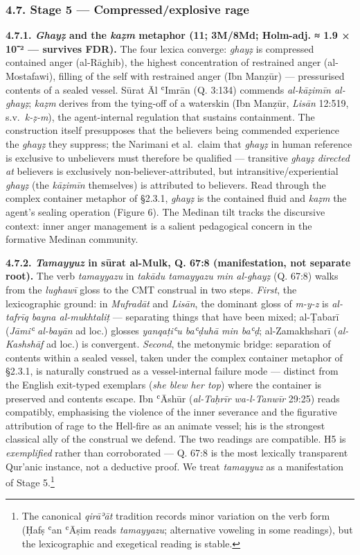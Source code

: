 \documentclass[11pt,a4paper]{article}
\begin{document}
\subsubsection{4.7. Stage 5 --- Compressed/explosive
rage}\label{stage-5-compressedexplosive-rage}

\textbf{4.7.1. \emph{Ghayẓ} and the \emph{kaẓm} metaphor (11; 3M/8Md;
Holm-adj. ≈ 1.9 × 10⁻² --- survives FDR).} The four lexica converge:
\emph{ghayẓ} is compressed contained anger (al-Rāghib), the highest
concentration of restrained anger (al-Mostafawi), filling of the self
with restrained anger (Ibn Manẓūr) --- pressurised contents of a sealed
vessel. Sūrat Āl ʿImrān (Q. 3:134) commends \emph{al-kāẓimīn al-ghayẓ};
\emph{kaẓm} derives from the tying-off of a waterskin (Ibn Manẓūr,
\emph{Lisān} 12:519, s.v.~\emph{k-ẓ-m}), the agent-internal regulation
that sustains containment. The construction itself presupposes that the
believers being commended experience the \emph{ghayẓ} they suppress; the
Narimani et al.~claim that \emph{ghayẓ} in human reference is exclusive
to unbelievers must therefore be qualified --- transitive \emph{ghayẓ
directed at} believers is exclusively non-believer-attributed, but
intransitive/experiential \emph{ghayẓ} (the \emph{kāẓimīn} themselves)
is attributed to believers. Read through the complex container metaphor
of §2.3.1, \emph{ghayẓ} is the contained fluid and \emph{kaẓm} the
agent's sealing operation (Figure 6). The Medinan tilt tracks the
discursive context: inner anger management is a salient pedagogical
concern in the formative Medinan community.

\textbf{4.7.2. \emph{Tamayyuz} in sūrat al-Mulk, Q. 67:8 (manifestation,
not separate root).} The verb \emph{tamayyazu} in \emph{takādu tamayyazu
min al-ghayẓ} (Q. 67:8) walks from the \emph{lughawī} gloss to the CMT
construal in two steps. \emph{First}, the lexicographic ground: in
\emph{Mufradāt} and \emph{Lisān}, the dominant gloss of \emph{m-y-z} is
\emph{al-tafrīq bayna al-mukhtaliṭ} --- separating things that have been
mixed; al-Ṭabarī (\emph{Jāmiʿ al-bayān} ad loc.) glosses \emph{yanqaṭiʿu
baʿḍuhā min baʿḍ}; al-Zamakhsharī (\emph{al-Kashshāf} ad loc.) is
convergent. \emph{Second}, the metonymic bridge: separation of contents
within a sealed vessel, taken under the complex container metaphor of
§2.3.1, is naturally construed as a vessel-internal failure mode ---
distinct from the English exit-typed exemplars (\emph{she blew her top})
where the container is preserved and contents escape. Ibn ʿĀshūr
(\emph{al-Taḥrīr wa-l-Tanwīr} 29:25) reads compatibly, emphasising the
violence of the inner severance and the figurative attribution of rage
to the Hell-fire as an animate vessel; his is the strongest classical
ally of the construal we defend. The two readings are compatible. H5 is
\emph{exemplified} rather than corroborated --- Q. 67:8 is the most
lexically transparent Qur'anic instance, not a deductive proof. We treat
\emph{tamayyuz} as a manifestation of Stage 5.\footnote{The canonical
  \emph{qirāʾāt} tradition records minor variation on the verb form
  (Ḥafṣ ʿan ʿĀṣim reads \emph{tamayyazu}; alternative voweling in some
  readings), but the lexicographic and exegetical reading is stable.}
\end{document}
